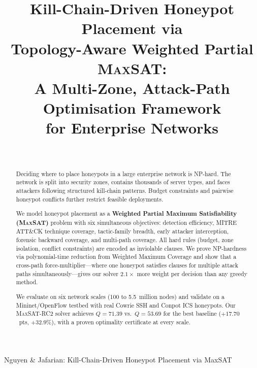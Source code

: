 \documentclass[journal]{IEEEtran}
\newcommand{\maxsat}{\textsc{MaxSAT}}
\begin{document}
\title{Kill-Chain-Driven Honeypot Placement via\\
       Topology-Aware Weighted Partial \textsc{MaxSAT}:\\
       A Multi-Zone, Attack-Path Optimisation Framework\\
       for Enterprise Networks}

\author{%
  \\
}

%
{Nguyen \& Jafarian: Kill-Chain-Driven Honeypot Placement via MaxSAT}

\maketitle

\begin{abstract}
Deciding where to place honeypots in a large enterprise
network is NP-hard.
The network is split into security zones, contains thousands
of server types, and faces attackers following structured
kill-chain patterns.
Budget constraints and pairwise honeypot conflicts further
restrict feasible deployments.

We model honeypot placement as a \textbf{Weighted Partial
Maximum Satisfiability (\maxsat{})} problem with six
simultaneous objectives: detection efficiency, MITRE
ATT\&CK technique coverage, tactic-family breadth, early
attacker interception, forensic backward coverage, and
multi-path coverage.
All hard rules (budget, zone isolation, conflict constraints)
are encoded as inviolable clauses.
We prove NP-hardness via polynomial-time reduction from
Weighted Maximum Coverage and show that a cross-path
force-multiplier---where one honeypot satisfies clauses for
multiple attack paths simultaneously---gives our solver
$2.1\times$ more weight per decision than any greedy method.

We evaluate on six network scales (100 to 5.5~million nodes)
and validate on a Mininet/OpenFlow testbed with real Cowrie
SSH and Conpot ICS honeypots.
Our \maxsat{}-RC2 solver achieves $Q=71.39$ vs.\ $Q=53.69$
for the best baseline ($+17.70$~pts, $+32.9\%$), with a
proven optimality certificate at every scale.
\end{abstract}
\end{document}
